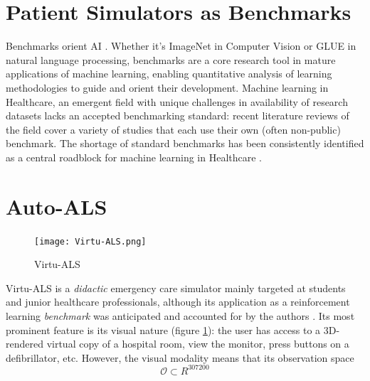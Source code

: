 


\newpage
\section{Patient Simulators as Benchmarks}

Benchmarks orient AI \cite{liangHolisticEvaluationLanguage2022}. Whether it's ImageNet \cite{dengImagenetLargescaleHierarchical2009} in Computer Vision or GLUE \cite{wangGLUEMultitaskBenchmark2018} in natural language processing, benchmarks are a core research tool in mature applications of machine learning, enabling quantitative analysis of learning methodologies to guide and orient their development.
Machine learning in Healthcare, an emergent field with unique challenges in availability of research datasets \cite{Anshik2021Handling, Gilbert2015market, Pahwa2021Big, Yazhini2019State} lacks an accepted benchmarking standard: recent literature reviews \cite{palMachineLearningHealthcare2023,tortorellaHealthcareTrendsChallenges2020} of the field cover a variety of studies that each use their own (often non-public) benchmark. The shortage of standard benchmarks has been consistently identified as a central roadblock for machine learning in Healthcare
\cite{Crown2015Potential, David2020Evaluating, guSupervisedLearningPervasive2023, harutyunyanMultitaskLearningBenchmarking2019, Kathrin2022Benchmark, liventsevEffectivePatientSimulators2021, mcdermottReproducibilityMachineLearning2021, purushothamBenchmarkingDeepLearning2018, S2017Benchmark}.

\newpage
\section{Auto-ALS}
\label{sec:virtu-als}


\begin{figure}
    \centering
    \texttt{[image: Virtu-ALS.png]}
    \caption{Virtu-ALS}
    \label{fig:virtu-als}
\end{figure}

Virtu-ALS is a \emph{didactic} emergency care simulator mainly targeted at students and junior healthcare professionals, although its application as a reinforcement learning \emph{benchmark} was anticipated and accounted for by the authors \cite{briskAIEnhanceInteractive2018}.
Its most prominent feature is its visual nature (figure \ref{fig:virtu-als}): the user has access to a 3D-rendered virtual copy of a hospital room, view the monitor, press buttons on a defibrillator, etc.
However, the visual modality means that its observation space 
\begin{equation}
    \mathcal{O} \subset R^{307200}
\end{equation}

